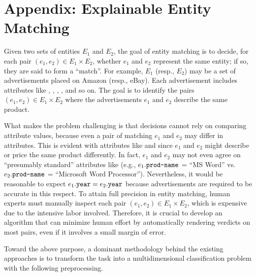 

\appendix

\section*{Appendix: Explainable Entity Matching} \label{sec:em}

Given two sets of entities $E_1$ and $E_2$, the goal of entity matching is to decide, for each pair $(e_1, e_2) \in E_1 \times E_2$, whether $e_1$ and $e_2$ represent the same entity; if so, they are said to form a ``match''. For example, $E_1$ (resp., $E_2$) may be a set of advertisements placed on Amazon (resp., eBay). Each advertisement includes attributes like , , , , and so on. The goal is to identify the pairs $(e_1, e_2) \in E_1 \times E_2$ where the advertisements $e_1$ and $e_2$ describe the same product.

\vgap

What makes the problem challenging is that decisions cannot rely on comparing attribute values, because even a pair of matching $e_1$ and $e_2$ may differ in attributes. This is evident with attributes like  and  since $e_1$ and $e_2$ might describe or price the same product differently. In fact, $e_1$ and $e_2$ may not even agree on ``presumably standard'' attributes like  (e.g., $e_1.\texttt{prod-name}$ = ``MS Word'' vs.\ $e_2.\texttt{prod-name}$ = ``Microsoft Word Processor''). Nevertheless, it would be reasonable to expect $e_1.\texttt{year} = e_2.\texttt{year}$ because advertisements are required to be accurate in this respect. To attain full precision in entity matching, human experts must manually inspect each pair $(e_1, e_2) \in E_1 \times E_2$, which is expensive due to the intensive labor involved. Therefore, it is crucial to develop an algorithm that can minimize human effort by automatically rendering verdicts on most pairs, even if it involves a small margin of error.

\vgap

Toward the above purpose, a dominant methodology behind the existing approaches is to transform the task into a multidimensional classification problem with the following preprocessing.

